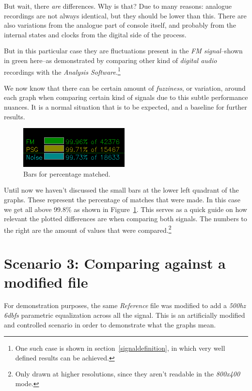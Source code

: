 \documentclass[10pt,a4paper]{report}
\newcommand{\hz}[1]{\textit{\mbox{#1\acrshort{hz}}}}
\newcommand{\db}[1]{\textit{\mbox{#1\acrshort{dbfs}}}}
\begin{document}
But wait, there \textit{are} differences. Why is that? Due to many reasons: analogue recordings are not always identical, but they should be lower than this. There are also variations from the analogue part of console itself, and probably from the internal states and clocks from the digital side of the process. 

But in this particular case they are fluctuations present in the \textit{FM signal}--shown in green here--as demonstrated by comparing other kind of \textit{digital audio} recordings with the \textit{Analysis Software}.\footnote{One such case is shown in section~\ref{signaldefinition}, in which very well defined results can be achieved.}

We now know that there can be certain amount of \textit{fuzziness}, or variation, around each graph when comparing certain kind of signals due to this subtle performance nuances. It is a normal situation that is to be expected, and a baseline for further results.

\begin{figure}[H]
	\centering
	\includegraphics[width=0.4\linewidth]{images/interpretation/Plot2-Sameconsole-bars.png}
	\caption[Bars]{Bars for percentage matched.}
	\label{fig:plot2-sameconsole-bars}
\end{figure}

Until now we haven't discussed the small bars at the lower left quadrant of the graphs. These represent the percentage of matches that were made. In this case we get all above 99.8\% as shown in Figure~\ref{fig:plot2-sameconsole-bars}. This serves as a quick guide on how relevant the plotted differences are when comparing both signals. The numbers to the right are the amount of values that were compared.\footnote{Only drawn at higher resolutions, since they aren't readable in the \textit{800x400} mode.}

\section{Scenario 3: Comparing against a modified file}
\label{scenario3}

For demonstration purposes, the same \textit{Reference} file was modified to add a \hz{500} \db{6} parametric equalization across all the signal. This is an artificially modified and controlled scenario in order to demonstrate what the graphs mean.
\end{document}
